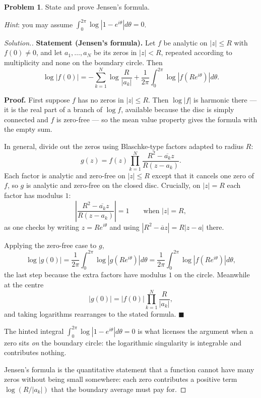 \documentclass[11pt,a4paper]{article}
\theoremstyle{definition}
\newtheorem{problemx}{Problem}[section]
\newenvironment{problem}{\begin{problemx}}{\end{problemx}}
\newenvironment{solution}
  {\renewcommand{\qedsymbol}{}\begin{proof}[\textit{Solution}.]}
  {\end{proof}}
\begin{document}
\begin{problem}
State and prove Jensen's formula.

\textit{Hint}: you may assume
$\displaystyle\int^{2\pi}_{0}\log\left|1 - e^{i\theta}\right|d\theta = 0$.
\end{problem}

\begin{solution}
\textbf{Statement (Jensen's formula).} Let $f$ be analytic on
$\left|z\right| \leq R$ with $f(0) \neq 0$, and let $a_1,\ldots,a_N$ be its zeros
in $\left|z\right| < R$, repeated according to multiplicity and none on the
boundary circle. Then
$$\log\left|f(0)\right|
= -\sum^{N}_{k=1}\log\frac{R}{\left|a_k\right|}
+ \frac{1}{2\pi}\int^{2\pi}_{0}\log\left|f\!\left(Re^{i\theta}\right)\right|d\theta .$$

\textbf{Proof.} First suppose $f$ has no zeros in $\left|z\right| \leq R$. Then
$\log\left|f\right|$ is harmonic there --- it is the real part of a branch of
$\log f$, available because the disc is simply connected and $f$ is zero-free --- so
the mean value property gives the formula with the empty sum.

In general, divide out the zeros using Blaschke-type factors adapted to radius $R$:
$$g(z) = f(z)\prod^{N}_{k=1}\frac{R^{2}-\overline{a_k}z}{R\left(z-a_k\right)} .$$
Each factor is analytic and zero-free on $\left|z\right| \leq R$ except that it
cancels one zero of $f$, so $g$ is analytic and zero-free on the closed disc.
Crucially, on $\left|z\right| = R$ each factor has modulus $1$:
$$\left|\frac{R^{2}-\overline{a_k}z}{R(z-a_k)}\right| = 1
\qquad \text{when } \left|z\right| = R,$$
as one checks by writing $z = Re^{i\theta}$ and using
$\left|R^{2}-\overline{a}z\right| = R\left|z - a\right|$ there.

Applying the zero-free case to $g$,
$$\log\left|g(0)\right|
= \frac{1}{2\pi}\int^{2\pi}_{0}\log\left|g\!\left(Re^{i\theta}\right)\right|d\theta
= \frac{1}{2\pi}\int^{2\pi}_{0}\log\left|f\!\left(Re^{i\theta}\right)\right|d\theta,$$
the last step because the extra factors have modulus $1$ on the circle. Meanwhile
at the centre
$$\left|g(0)\right| = \left|f(0)\right|\prod^{N}_{k=1}\frac{R}{\left|a_k\right|},$$
and taking logarithms rearranges to the stated formula. $\blacksquare$

The hinted integral $\int_0^{2\pi}\log\left|1-e^{i\theta}\right|d\theta = 0$ is
what licenses the argument when a zero sits \emph{on} the boundary circle: the
logarithmic singularity is integrable and contributes nothing.

Jensen's formula is the quantitative statement that a function cannot have many
zeros without being small somewhere: each zero contributes a positive term
$\log(R/\left|a_k\right|)$ that the boundary average must pay for.
\end{solution}
\end{document}
